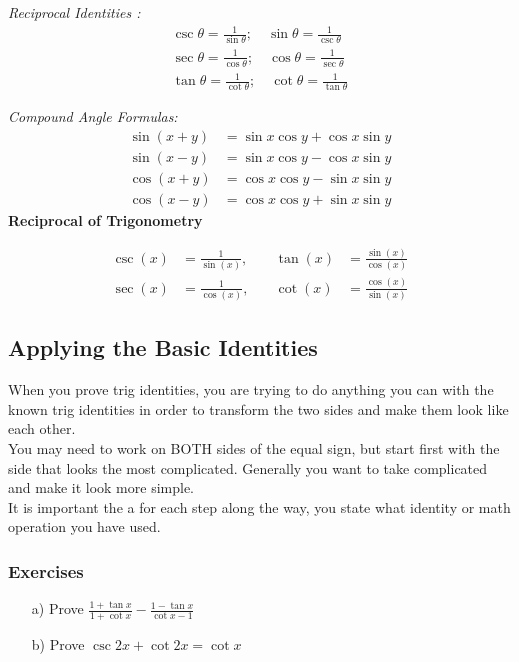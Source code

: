 \documentclass{article}
\begin{document}
\textit{Reciprocal Identities :}
$$
\begin{array}{ll}
\csc \theta=\frac{1}{\sin \theta} ; \quad \sin \theta=\frac{1}{\csc \theta} \\
\sec \theta=\frac{1}{\cos \theta} ; \quad \cos \theta=\frac{1}{\sec \theta} \\
\tan \theta=\frac{1}{\cot \theta} ; \quad \cot \theta=\frac{1}{\tan \theta}
\end{array}
$$

\textit{Compound Angle Formulas:}
$$
\begin{aligned}
\sin (x+y) & =\sin x \cos y+\cos x \sin y \\
\sin (x-y) & =\sin x \cos y-\cos x \sin y \\
\cos (x+y) & =\cos x \cos y-\sin x \sin y \\
\cos (x-y) & =\cos x \cos y+\sin x \sin y
\end{aligned}
$$
\textbf{Reciprocal of Trigonometry}
  \begin{spreadlines}{1.5ex}
    \begin{alignat*}{2}
      \csc(x) & = \tfrac 1 {\sin(x)}, \quad & \tan(x) & = \tfrac {\sin(x)} {\cos(x)} \\
      \sec(x) & = \tfrac 1 {\cos(x)}, \quad & \cot(x) & = \tfrac {\cos(x)} {\sin(x)}
    \end{alignat*}
  \end{spreadlines}
\subsection{Applying the Basic Identities}
When you prove trig identities, you are trying to do anything you can with the known trig identities in order to transform the two sides and make them look like each other.\\


You may need to work on BOTH sides of the equal sign, but start first with the side that looks the most complicated. Generally you want to take complicated and make it look more simple.\\


It is important the a for each step along the way, you state what identity or math operation you have used.

\subsubsection{Exercises}  
\begin{enumerate}
    \item[a)] Prove $\frac{1+\tan x}{1+\cot x}-\frac{1-\tan x}{\cot x-1}$ 
    \item[b)] Prove $\csc 2x+\cot 2x=\cot x$ 
\end{enumerate}
\newpage 
\end{document}
